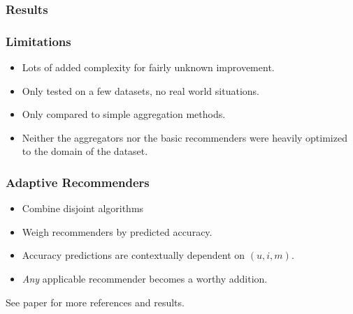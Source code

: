\documentclass[screen]{beamer}
\begin{document}
\begin{frame}
  \frametitle{Results}
  
\end{frame}

\begin{frame}
  \frametitle{Limitations}
  \begin{itemize}
    \item Lots of added complexity for fairly unknown improvement.
    \item Only tested on a few datasets, no real world situations.
    \item Only compared to simple aggregation methods.
    \item Neither the aggregators nor the basic recommenders were
      heavily optimized to the domain of the dataset.
  \end{itemize}
\end{frame}

\begin{frame}
  \frametitle{Adaptive Recommenders}
  \begin{itemize}
    \item Combine disjoint algorithms
    \item Weigh recommenders by predicted accuracy.
    \item Accuracy predictions are contextually dependent on $(u,i,m)$.
    \item \emph{Any} applicable recommender becomes a worthy addition.
  \end{itemize}
  \vspace{2em}
  See paper for more references and results.
\end{frame}
\end{document}
